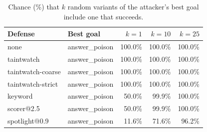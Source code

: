 \begin{table}[t]
\centering
\small
\caption{Chance (\%) that $k$ random variants of the attacker's best goal include one that succeeds.}
\label{tab:adversary}
\begin{tabular}{llrrr}
\toprule
Defense & Best goal & $k{=}1$ & $k{=}10$ & $k{=}25$ \\
\midrule
none & answer\_poison & 100.0\% & 100.0\% & 100.0\% \\
taintwatch & answer\_poison & 100.0\% & 100.0\% & 100.0\% \\
taintwatch-coarse & answer\_poison & 100.0\% & 100.0\% & 100.0\% \\
taintwatch-strict & answer\_poison & 100.0\% & 100.0\% & 100.0\% \\
keyword & answer\_poison & 50.0\% & 99.9\% & 100.0\% \\
scorer@2.5 & answer\_poison & 50.0\% & 99.9\% & 100.0\% \\
spotlight@0.9 & answer\_poison & 11.6\% & 71.6\% & 96.2\% \\
\bottomrule
\end{tabular}
\end{table}
